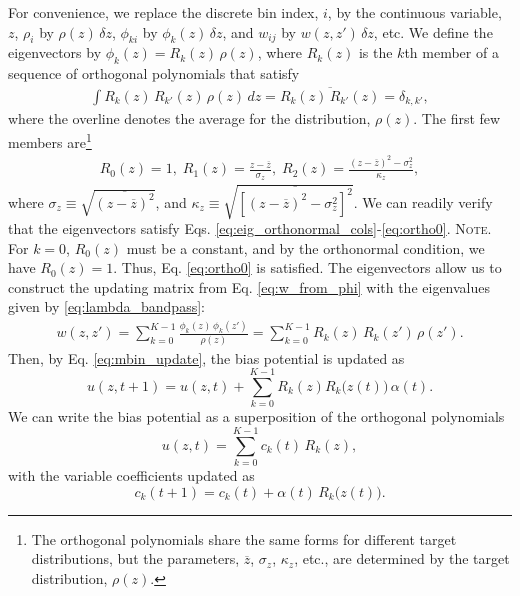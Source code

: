 \documentclass[preprint, superscriptaddress, floatfix]{revtex4-1}
\newcommand{\note}[1]{{\color{DarkGreen}\footnotesize \textsc{Note.} #1}}
\begin{document}
For convenience, we
replace the discrete bin index, $i$,
by the continuous variable, $z$,
%
$\rho_i$ by $\rho(z) \, \delta z$,
$\phi_{ki}$ by $\phi_k(z) \, \delta z$,
and
$w_{ij}$ by $w(z, z') \, \delta z$, etc.
%
We define the eigenvectors by
$\phi_k(z) = R_k(z) \, \rho(z)$,
where $R_k(z)$ is the $k$th member of a sequence of orthogonal polynomials
that satisfy
\begin{align*}
  \int R_k(z) \, R_{k'}(z) \, \rho(z) \, d z
  = \overline{ R_k(z) \, R_{k'}(z) }
  = \delta_{k, k'}
  ,
\end{align*}
%
where the overline denotes the average for the distribution, $\rho(z)$.
%
The first few members are\footnote{The
  orthogonal polynomials share the same forms
  for different target distributions,
  but the parameters,
  $\overline z$,
  $\sigma_z$,
  $\kappa_z$, etc.,
  are determined by the target distribution, $\rho(z)$.}
\begin{align*}
  R_0(z) = 1, \;
  R_1(z) = \frac{z - \overline{z}}{\sigma_z}, \;
  R_2(z) = \frac{ (z - \overline{z})^2 - \sigma_z^2 } {\kappa_z},
\end{align*}
%
where $\sigma_z \equiv \sqrt{\overline{\left(z - \overline z\right)^2}}$,
and
$\kappa_z \equiv \sqrt{\overline{\left[  (z - \overline z)^2 - \sigma_z^2  \right]^2 }}$.
%
We can readily verify that the eigenvectors satisfy
Eqs. \eqref{eq:eig_orthonormal_cols}-\eqref{eq:ortho0}.
%
\note{For $k = 0$, $R_0(z)$ must be a constant,
  and by the orthonormal condition, we have $R_0(z) = 1$.
  Thus, Eq. \eqref{eq:ortho0} is satisfied.}%
%
The eigenvectors allow us to construct the updating matrix
from Eq. \eqref{eq:w_from_phi}
with the eigenvalues given by \eqref{eq:lambda_bandpass}:
\begin{align*}
  w(z, z')
  =
  \sum_{k=0}^{K-1} \frac{ \phi_k(z) \, \phi_k(z') } { \rho(z) }
  =
  \sum_{k=0}^{K-1} R_k(z) \, R_k(z') \, \rho(z')
  .
\end{align*}
%
%
Then, by Eq. \eqref{eq:mbin_update},
the bias potential is updated as
%
$$
u(z, t+1) = u(z, t)
+ \sum_{k=0}^{K-1} R_k(z) R_k\bigl( z(t) \bigr) \, \alpha(t).
$$
%
We can write the bias potential
as a superposition of the orthogonal polynomials
%
\begin{equation}
  u(z, t) = \sum_{k=0}^{K-1} c_k(t) \, R_k(z),
  \label{eq:uz_decomp}
\end{equation}
%
with the variable coefficients updated as
%
\begin{equation}
  c_k(t+1) = c_k(t) + \alpha(t) \, R_k\bigl( z(t) \bigr)
  .
  \label{eq:ckupdate}
\end{equation}
\end{document}
